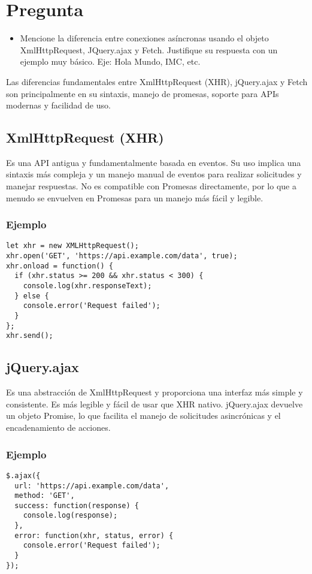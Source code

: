 \documentclass{article}
\begin{document}
\section{Pregunta}
\begin{itemize}
    \item Mencione la diferencia entre conexiones asíncronas usando el objeto XmlHttpRequest, JQuery.ajax
y Fetch. Justifique su respuesta con un ejemplo muy básico. Eje: Hola Mundo, IMC, etc.
\end{itemize}
Las diferencias fundamentales entre XmlHttpRequest (XHR), jQuery.ajax y Fetch son principalmente en su sintaxis, manejo de promesas, soporte para APIs modernas y facilidad de uso.
\subsection{XmlHttpRequest (XHR)}
\item{Es una API antigua y fundamentalmente basada en eventos. Su uso implica una sintaxis más compleja y un manejo manual de eventos para realizar solicitudes y manejar respuestas. No es compatible con Promesas directamente, por lo que a menudo se envuelven en Promesas para un manejo más fácil y legible.}
\subsubsection{Ejemplo}
\begin{lstlisting}[style=ascii-tree]
let xhr = new XMLHttpRequest();
xhr.open('GET', 'https://api.example.com/data', true);
xhr.onload = function() {
  if (xhr.status >= 200 && xhr.status < 300) {
    console.log(xhr.responseText);
  } else {
    console.error('Request failed');
  }
};
xhr.send();
\end{lstlisting}

\subsection{jQuery.ajax}
\item{Es una abstracción de XmlHttpRequest y proporciona una interfaz más simple y consistente. Es más legible y fácil de usar que XHR nativo. jQuery.ajax devuelve un objeto Promise, lo que facilita el manejo de solicitudes asincrónicas y el encadenamiento de acciones.}
\subsubsection{Ejemplo}
\begin{lstlisting}[style=ascii-tree]
$.ajax({
  url: 'https://api.example.com/data',
  method: 'GET',
  success: function(response) {
    console.log(response);
  },
  error: function(xhr, status, error) {
    console.error('Request failed');
  }
});
\end{lstlisting}
\end{document}
